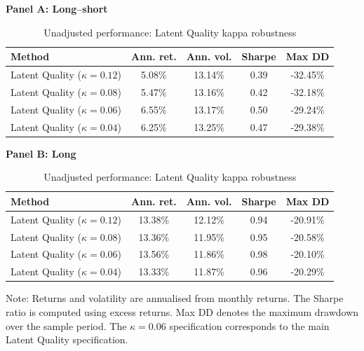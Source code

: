 \begin{table}[H]
\centering
\footnotesize
\renewcommand{\arraystretch}{1.12}
\setlength{\tabcolsep}{4pt}
\caption[Unadjusted performance: Latent Quality kappa robustness]{Unadjusted performance: Latent Quality kappa robustness}
\label{tab:latent_kappa_raw_performance}
\begin{threeparttable}
{\centering\textbf{Panel A: Long--short}\par}
\vspace{0.4em}
\begin{tabular*}{\textwidth}{@{\extracolsep{\fill}}lcccc}
\toprule
Method & Ann. ret. & Ann. vol. & Sharpe & Max DD \\
\midrule
Latent Quality ($\kappa=0.12$) & 5.08\% & 13.14\% & 0.39 & -32.45\% \\
Latent Quality ($\kappa=0.08$) & 5.47\% & 13.16\% & 0.42 & -32.18\% \\
Latent Quality ($\kappa=0.06$) & 6.55\% & 13.17\% & 0.50 & -29.24\% \\
Latent Quality ($\kappa=0.04$) & 6.25\% & 13.25\% & 0.47 & -29.38\% \\
\bottomrule
\end{tabular*}
\vspace{1em}
{\centering\textbf{Panel B: Long}\par}
\vspace{0.4em}
\begin{tabular*}{\textwidth}{@{\extracolsep{\fill}}lcccc}
\toprule
Method & Ann. ret. & Ann. vol. & Sharpe & Max DD \\
\midrule
Latent Quality ($\kappa=0.12$) & 13.38\% & 12.12\% & 0.94 & -20.91\% \\
Latent Quality ($\kappa=0.08$) & 13.36\% & 11.95\% & 0.95 & -20.58\% \\
Latent Quality ($\kappa=0.06$) & 13.56\% & 11.86\% & 0.98 & -20.10\% \\
Latent Quality ($\kappa=0.04$) & 13.33\% & 11.87\% & 0.96 & -20.29\% \\
\bottomrule
\end{tabular*}
\begin{tablenotes}[flushleft]
\scriptsize
\item Note: Returns and volatility are annualised from monthly returns. The Sharpe ratio is computed using excess returns. Max DD denotes the maximum drawdown over the sample period. The $\kappa=0.06$ specification corresponds to the main Latent Quality specification.
\end{tablenotes}
\end{threeparttable}
\end{table}
